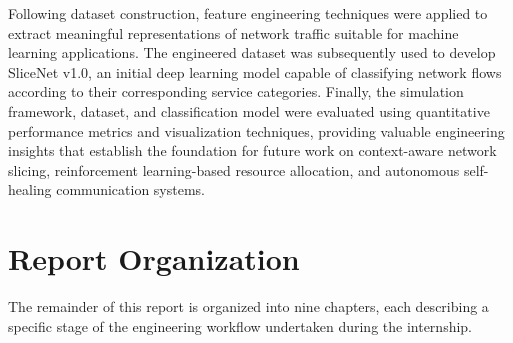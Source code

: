 \documentclass[12pt,a4paper]{report}
\begin{document}
	Following dataset construction, feature engineering techniques were applied to extract meaningful representations of network traffic suitable for machine learning applications. The engineered dataset was subsequently used to develop SliceNet v1.0, an initial deep learning model capable of classifying network flows according to their corresponding service categories. Finally, the simulation framework, dataset, and classification model were evaluated using quantitative performance metrics and visualization techniques, providing valuable engineering insights that establish the foundation for future work on context-aware network slicing, reinforcement learning-based resource allocation, and autonomous self-healing communication systems.
	
	
	\section{Report Organization}
	\label{sec:organization}
	
	The remainder of this report is organized into nine chapters, each describing a specific stage of the engineering workflow undertaken during the internship.
	
\end{document}
